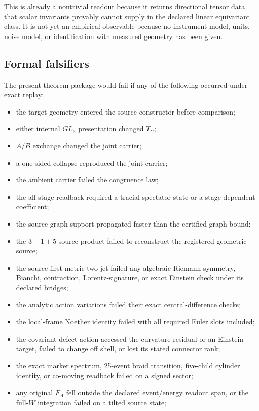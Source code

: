 This is already a nontrivial readout because it returns directional tensor data that scalar invariants provably cannot supply in the declared linear equivariant class. It is not yet an empirical observable because no instrument model, units, noise model, or identification with measured geometry has been given.

\subsection{Formal falsifiers}

The present theorem package would fail if any of the following occurred under exact replay:
\begin{itemize}
\item the target geometry entered the source constructor before comparison;
\item either internal $GL_3$ presentation changed $T_C$;
\item $A/B$ exchange changed the joint carrier;
\item a one-sided collapse reproduced the joint carrier;
\item the ambient carrier failed the congruence law;
\item the all-stage readback required a tracial spectator state or a stage-dependent coefficient;
\item the source-graph support propagated faster than the certified graph bound;
\item the $3+1+5$ source product failed to reconstruct the registered geometric source;
\item the source-first metric two-jet failed any algebraic Riemann symmetry, Bianchi, contraction, Lorentz-signature, or exact Einstein check under its declared bridges;
\item the analytic action variations failed their exact central-difference checks;
\item the local-frame Noether identity failed with all required Euler slots included;
\item the covariant-defect action accessed the curvature residual or an Einstein target, failed to change off shell, or lost its stated connector rank;
\item the exact marker spectrum, 25-event braid transition, five-child cylinder identity, or co-moving readback failed on a signed sector;
\item any original $F_A$ fell outside the declared event/energy readout span, or the full-$W$ integration failed on a tilted source state;

\end{itemize}
